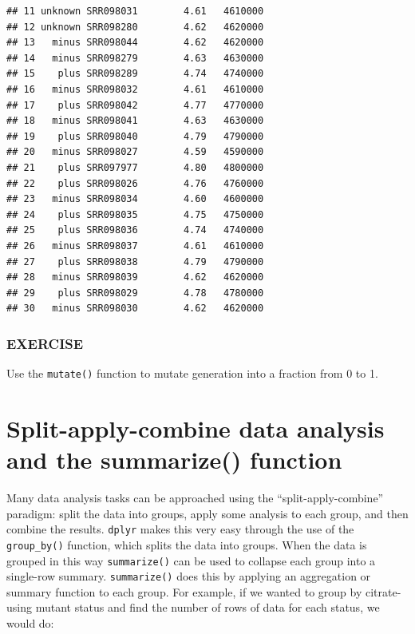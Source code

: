 \documentclass[]{book}
\newenvironment{Shaded}{\begin{snugshade}}{\end{snugshade}}
\newcommand{\KeywordTok}[1]{\textcolor[rgb]{0.13,0.29,0.53}{\textbf{#1}}}
\newcommand{\NormalTok}[1]{#1}
\newcommand{\OperatorTok}[1]{\textcolor[rgb]{0.81,0.36,0.00}{\textbf{#1}}}
\newcommand{\StringTok}[1]{\textcolor[rgb]{0.31,0.60,0.02}{#1}}
\begin{document}
\begin{verbatim}
## 11 unknown SRR098031        4.61   4610000
## 12 unknown SRR098280        4.62   4620000
## 13   minus SRR098044        4.62   4620000
## 14   minus SRR098279        4.63   4630000
## 15    plus SRR098289        4.74   4740000
## 16   minus SRR098032        4.61   4610000
## 17    plus SRR098042        4.77   4770000
## 18   minus SRR098041        4.63   4630000
## 19    plus SRR098040        4.79   4790000
## 20   minus SRR098027        4.59   4590000
## 21    plus SRR097977        4.80   4800000
## 22    plus SRR098026        4.76   4760000
## 23   minus SRR098034        4.60   4600000
## 24    plus SRR098035        4.75   4750000
## 25    plus SRR098036        4.74   4740000
## 26   minus SRR098037        4.61   4610000
## 27    plus SRR098038        4.79   4790000
## 28   minus SRR098039        4.62   4620000
## 29    plus SRR098029        4.78   4780000
## 30   minus SRR098030        4.62   4620000
\end{verbatim}

\hypertarget{exercise-18}{%
\subsubsection*{EXERCISE}\label{exercise-18}}

Use the \texttt{mutate()} function to mutate generation into a fraction from 0 to 1.

\hypertarget{split-apply-combine-data-analysis-and-the-summarize-function}{%
\section{Split-apply-combine data analysis and the summarize() function}\label{split-apply-combine-data-analysis-and-the-summarize-function}}

Many data analysis tasks can be approached using the ``split-apply-combine'' paradigm: split the data into groups, apply some analysis to each group, and then combine the results. \texttt{dplyr} makes this very easy through the use of the \texttt{group\_by()} function, which splits the data into groups. When the data is grouped in this way \texttt{summarize()} can be used to collapse each group into a single-row summary. \texttt{summarize()} does this by applying an aggregation or summary function to each group. For example, if we wanted to group by citrate-using mutant status and find the number of rows of data for each status, we would do:

\begin{Shaded}
\end{Shaded}
\end{document}
